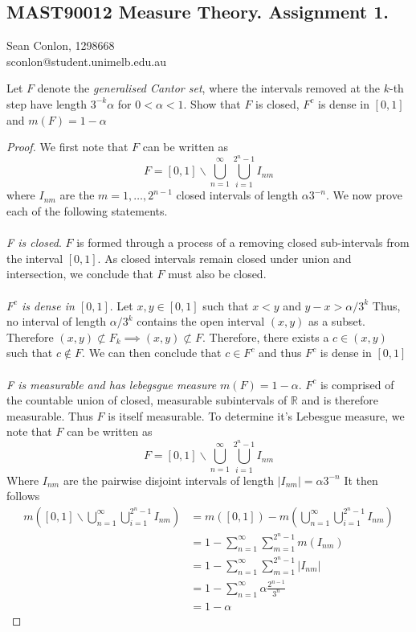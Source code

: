 \documentclass[nocolor]{report}
\begin{document}
    \newpage
    \subsection*{MAST90012 Measure Theory. Assignment 1.}
\begin{center}
    Sean Conlon, 1298668 \\
    sconlon@student.unimelb.edu.au
\end{center}


\begin{ex}[Question 1.
] Let $F$ denote the \textit{generalised Cantor set}, where the intervals removed at the $k$-th step have length $3^{-k}\alpha$ for $0<\alpha<1$. Show that $F$ is closed, $F^c$ is dense in $[0,1]$ and $m(F) = 1-\alpha$
\end{ex}
\begin{proof}
We first note that $F$ can be written as 
$$F = [0,1]\backslash \bigcup_{n=1}^{\infty}\bigcup_{i=1}^{2^n -1} I_{nm}$$
where $I_{nm}$ are the $m=1,\dots, 2^{n-1}$ closed intervals of length $\alpha3^{-n}$. We now prove each of the following statements. \\
\\
\textit{F is closed}. $F$ is formed through a process of a removing closed sub-intervals from the interval $[0,1]$. As closed intervals remain closed under union and intersection, we conclude that $F$ must also be closed. \\
\\
\textit{$F^c$ is dense in $[0,1]$}. Let $x,y\in[0,1]$ such that $x<y$ and $y-x > \alpha/3^k$ Thus, no interval of length $\alpha/3^k$ contains the open interval $(x,y)$ as a subset. Therefore $(x,y)\not\subset F_k \implies (x,y)\not\subset F$. Therefore, there exists a $c\in(x,y)$ such that $c\notin F$. We can then conclude that $c\in F^c$ and thus $F^c$ is dense in $[0,1]$ \\
\\
\textit{F is measurable and has lebegsgue measure $m(F) = 1-\alpha$}. $F^c$  is comprised of the countable union of closed, measurable subintervals of $\mathbb{R}$ and is therefore measurable. Thus $F$ is itself measurable. To determine it's Lebesgue measure, we note that $F$ can be written as 
$$F = [0,1]\backslash \bigcup_{n=1}^{\infty}\bigcup_{i=1}^{2^n -1} I_{nm}$$
Where $I_{nm}$ are the pairwise disjoint intervals of length $|I_{nm}| = \alpha 3^{-n}$ It then follows 
\begin{align*}
    m\left([0,1]\backslash \bigcup_{n=1}^{\infty}\bigcup_{i=1}^{2^n -1} I_{nm} \right) &= m([0,1]) - m\left( \bigcup_{n=1}^{\infty}\bigcup_{i=1}^{2^n -1} I_{nm}\right) \\
    &= 1 - \sum_{n=1}^{\infty}\sum_{m=1}^{2^n -1} m(I_{nm}) \\
    &= 1 - \sum_{n=1}^{\infty}\sum_{m=1}^{2^n -1} |I_{nm}| \\
    &= 1 - \sum_{n=1}^{\infty} \alpha \frac{2^{n-1}}{3^n} \\
    &= 1 - \alpha
\end{align*}


\end{proof}
\end{document}
